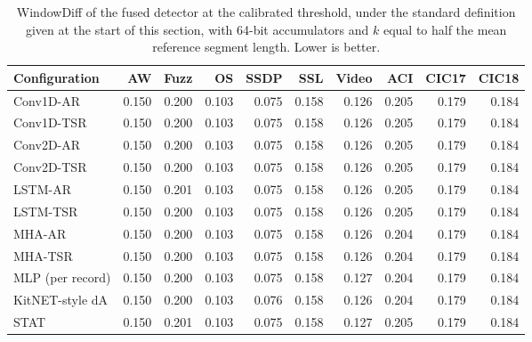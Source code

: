 \begin{table}[ht]\centering\footnotesize\setlength{\tabcolsep}{3.5pt}
\begin{tabular}{lrrrrrrrrr}
\hline
\textbf{Configuration} & \textbf{AW} & \textbf{Fuzz} & \textbf{OS} & \textbf{SSDP} & \textbf{SSL} & \textbf{Video} & \textbf{ACI} & \textbf{CIC17} & \textbf{CIC18}\\
\hline
Conv1D-AR & 0.150 & 0.200 & 0.103 & 0.075 & 0.158 & 0.126 & 0.205 & 0.179 & 0.184\\
Conv1D-TSR & 0.150 & 0.200 & 0.103 & 0.075 & 0.158 & 0.126 & 0.205 & 0.179 & 0.184\\
Conv2D-AR & 0.150 & 0.200 & 0.103 & 0.075 & 0.158 & 0.126 & 0.205 & 0.179 & 0.184\\
Conv2D-TSR & 0.150 & 0.200 & 0.103 & 0.075 & 0.158 & 0.126 & 0.205 & 0.179 & 0.184\\
LSTM-AR & 0.150 & 0.201 & 0.103 & 0.075 & 0.158 & 0.126 & 0.205 & 0.179 & 0.184\\
LSTM-TSR & 0.150 & 0.200 & 0.103 & 0.075 & 0.158 & 0.126 & 0.205 & 0.179 & 0.184\\
MHA-AR & 0.150 & 0.200 & 0.103 & 0.075 & 0.158 & 0.126 & 0.204 & 0.179 & 0.184\\
MHA-TSR & 0.150 & 0.200 & 0.103 & 0.075 & 0.158 & 0.126 & 0.204 & 0.179 & 0.184\\
MLP (per record) & 0.150 & 0.200 & 0.103 & 0.075 & 0.158 & 0.127 & 0.204 & 0.179 & 0.184\\
KitNET-style dA & 0.150 & 0.200 & 0.103 & 0.076 & 0.158 & 0.126 & 0.204 & 0.179 & 0.184\\
STAT & 0.150 & 0.201 & 0.103 & 0.075 & 0.158 & 0.127 & 0.205 & 0.179 & 0.184\\
\hline
\end{tabular}
\caption{WindowDiff of the fused detector at the calibrated threshold, under the standard definition given at the start of this section, with 64-bit accumulators and $k$ equal to half the mean reference segment length. Lower is better.}\label{tab:s_wd}
\end{table}

